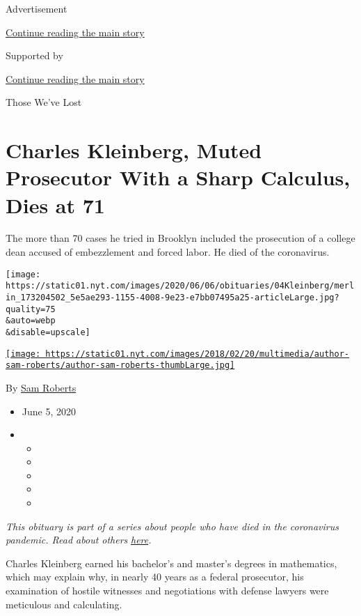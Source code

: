 Advertisement

\protect\hyperlink{after-top}{Continue reading the main story}

Supported by

\protect\hyperlink{after-sponsor}{Continue reading the main story}

Those We've Lost

\hypertarget{charles-kleinberg-muted-prosecutor-with-a-sharp-calculus-dies-at-71}{%
\section{Charles Kleinberg, Muted Prosecutor With a Sharp Calculus, Dies
at
71}\label{charles-kleinberg-muted-prosecutor-with-a-sharp-calculus-dies-at-71}}

The more than 70 cases he tried in Brooklyn included the prosecution of
a college dean accused of embezzlement and forced labor. He died of the
coronavirus.

\texttt{[image: https://static01.nyt.com/images/2020/06/06/obituaries/04Kleinberg/merlin\_173204502\_5e5ae293-1155-4008-9e23-e7bb07495a25-articleLarge.jpg?quality=75\\\&auto=webp\\\&disable=upscale]}

\href{https://www.nytimes.com/by/sam-roberts}{\texttt{[image: https://static01.nyt.com/images/2018/02/20/multimedia/author-sam-roberts/author-sam-roberts-thumbLarge.jpg]}}

By \href{https://www.nytimes.com/by/sam-roberts}{Sam Roberts}

\begin{itemize}
\item
  June 5, 2020
\item
  \begin{itemize}
  \item
  \item
  \item
  \item
  \item
  \end{itemize}
\end{itemize}

\emph{This obituary is part of a series about people who have died in
the coronavirus pandemic. Read about others}
\href{https://www.nytimes.com/interactive/2020/obituaries/people-died-coronavirus-obituaries.html}{\emph{here}}\emph{.}

Charles Kleinberg earned his bachelor's and master's degrees in
mathematics, which may explain why, in nearly 40 years as a federal
prosecutor, his examination of hostile witnesses and negotiations with
defense lawyers were meticulous and calculating.


